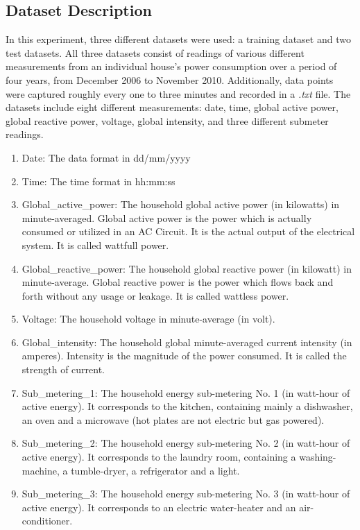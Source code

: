 \documentclass[letterpaper, 11pt]{article}%
\begin{document}
\subsection{Dataset Description}
In this experiment, three different datasets were used: a training dataset and two test datasets. All three datasets consist of readings of various different measurements from an individual house's power consumption over a period of four years, from December 2006 to November 2010. Additionally, data points were captured roughly every one to three minutes and recorded in a \textit{.txt} file. The datasets include eight different measurements: date, time, global active power, global reactive power, voltage, global intensity, and three different submeter readings.
\begin{enumerate}
  \item
    Date: The data format in dd/mm/yyyy
  \item
    Time: The time format in hh:mm:ss
  \item
    Global\_active\_power: The household global active power (in kilowatts) in minute-averaged. Global active power is the power which is actually consumed or utilized in an AC Circuit. It is the actual output of the electrical system. It is called wattfull power\cite{dataset}.
  \item
    Global\_reactive\_power: The household global reactive power (in kilowatt) in minute-average. Global reactive power is the power which flows back and forth without any usage or leakage. It is called wattless power.
  \item
    Voltage: The household voltage in minute-average (in volt).
  \item
    Global\_intensity: The household global minute-averaged current intensity (in amperes). Intensity is the magnitude of the power consumed. It is called the strength of current.
  \item
    Sub\_metering\_1: The household energy sub-metering No. 1 (in watt-hour of active energy). It corresponds to the kitchen, containing mainly a dishwasher, an oven and a microwave (hot plates are not electric but gas powered).
  \item
    Sub\_metering\_2: The household energy sub-metering No. 2 (in watt-hour of active energy). It corresponds to the laundry room, containing a washing-machine, a tumble-dryer, a refrigerator and a light.
  \item
    Sub\_metering\_3: The household energy sub-metering No. 3 (in watt-hour of active energy). It corresponds to an electric water-heater and an air-conditioner.
\end{enumerate}
\end{document}
